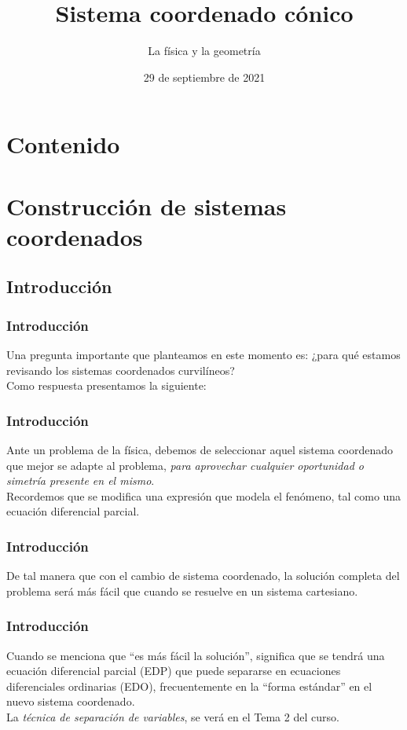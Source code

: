 \documentclass[12pt]{beamer}
\date{29 de septiembre de 2021}
\title{Sistema coordenado cónico}
\subtitle{La física y la geometría}
\begin{document}
\maketitle
\fontsize{14}{14}\selectfont
{}

\section*{Contenido}

\section{Construcción de sistemas coordenados}
\subsection{Introducción}

\begin{frame}
\frametitle{Introducción}
Una pregunta importante que planteamos en este momento es: ¿para qué estamos revisando los sistemas coordenados curvilíneos?
\\
\bigskip
\pause
Como respuesta presentamos la siguiente:
\end{frame}
\begin{frame}
\frametitle{Introducción}
Ante un problema de la física, debemos de seleccionar aquel sistema coordenado que mejor se adapte al problema, \emph{para aprovechar cualquier oportunidad o simetría presente en el mismo}.
\\
\bigskip
\pause
Recordemos que se modifica una expresión que modela el fenómeno, tal como una ecuación diferencial parcial.
\end{frame}
\begin{frame}
\frametitle{Introducción}
De tal manera que con el cambio de sistema coordenado, la solución completa del problema será más fácil que cuando se resuelve en un sistema cartesiano.
\end{frame}
\begin{frame}
\frametitle{Introducción}
Cuando se menciona que \enquote{es más fácil la solución}, significa que se tendrá una ecuación diferencial parcial (EDP) que puede separarse en ecuaciones diferenciales ordinarias (EDO), frecuentemente en la \enquote{forma estándar} en el nuevo sistema coordenado.
\\
\bigskip
\pause
La \emph{técnica de separación de variables}, se verá en el Tema 2 del curso.
\end{frame}
\end{document}
